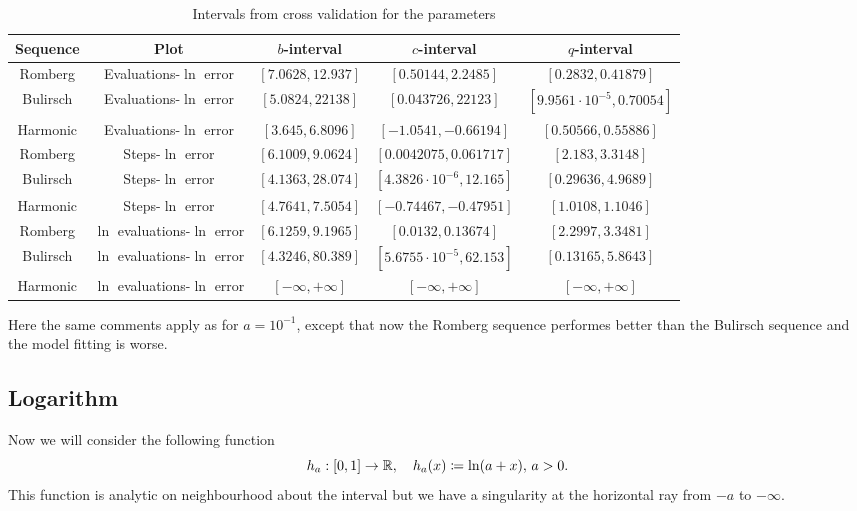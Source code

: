 \begin{table}[H]
    \centering
    \begin{tabular}{c|c||c|c|c}
Sequence & Plot & \(b\)-interval & \(c\)-interval & \(q\)-interval\\\hline
Romberg & Evaluations-\(\ln\) error &\([7.0628, 12.937]\) & \([0.50144, 2.2485]\) & \([0.2832, 0.41879]\)\\
Bulirsch & Evaluations-\(\ln\) error & \([5.0824, 22138]\) & \([0.043726, 22123]\) & \([9.9561\cdot 10^{-5}, 0.70054]\)\\
Harmonic & Evaluations-\(\ln\) error  & \([3.645, 6.8096]\) & \([-1.0541, -0.66194]\) & \([0.50566, 0.55886]\)\\
Romberg & Steps-\(\ln\) error & \([6.1009, 9.0624]\) & \([0.0042075, 0.061717]\) & \([2.183, 3.3148]\)\\
Bulirsch & Steps-\(\ln\) error & \([4.1363, 28.074]\) & \([4.3826\cdot 10^{-6}, 12.165]\) & \([0.29636, 4.9689]\)\\
Harmonic & Steps-\(\ln\) error  & \([4.7641, 7.5054]\) & \([-0.74467, -0.47951]\) & \([1.0108, 1.1046]\)\\
Romberg & \(\ln\) evaluations-\(\ln\) error & \([6.1259, 9.1965]\) & \([0.0132, 0.13674]\) & \([2.2997, 3.3481]\)\\
Bulirsch & \(\ln\) evaluations-\(\ln\) error & \([4.3246, 80.389]\) & \([5.6755\cdot 10^{-5}, 62.153]\) & \([0.13165, 5.8643]\)\\
Harmonic & \(\ln\) evaluations-\(\ln\) error & \([-\infty, +\infty]\) & \([-\infty, +\infty]\) & \([-\infty, +\infty]\)\\
    \end{tabular}
    \caption{Intervals from cross validation for the parameters}
    \label{tab:my_label}
\end{table}

Here the same comments apply as for \(a = 10^{-1}\), except that now the Romberg sequence performes better than the Bulirsch sequence and the model fitting is worse.

\subsection{Logarithm}

Now we will consider the following function 
\[
h_a: [0, 1] \rightarrow \mathbb{R}, \quad h_a(x) \coloneqq \ln(a + x),\, a > 0.
\]
This function is analytic on neighbourhood about the interval but we have a singularity at the horizontal ray from \(-a\) to \(-\infty\).

